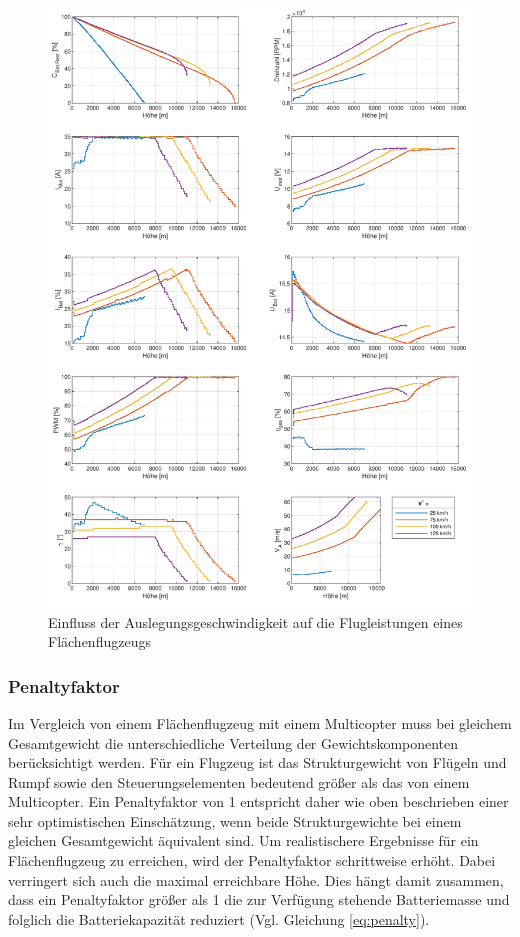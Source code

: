 \begin{figure}[H]
\centering
	\includegraphics[scale=0.7]{Diagramme/Flaechenflzg_Vstern.pdf}
	\caption{Einfluss der Auslegungsgeschwindigkeit auf die Flugleistungen eines Flächenflugzeugs}
	\label{abb:vstern}
\end{figure}



\subsubsection{Penaltyfaktor}
Im Vergleich von einem Flächenflugzeug mit einem Multicopter muss bei gleichem Gesamtgewicht die unterschiedliche Verteilung der Gewichtskomponenten berücksichtigt werden. Für ein Flugzeug ist das Strukturgewicht von Flügeln und Rumpf sowie den Steuerungselementen bedeutend größer als das von einem Multicopter. Ein Penaltyfaktor von 1 entspricht daher wie oben beschrieben einer sehr optimistischen Einschätzung, wenn beide Strukturgewichte bei einem gleichen Gesamtgewicht äquivalent sind. Um realistischere Ergebnisse für ein Flächenflugzeug zu erreichen, wird der Penaltyfaktor schrittweise erhöht. Dabei verringert sich auch die maximal erreichbare Höhe. Dies hängt damit zusammen, dass ein Penaltyfaktor größer als 1 die zur Verfügung stehende Batteriemasse und folglich die Batteriekapazität reduziert (Vgl. Gleichung \ref{eq:penalty}).

